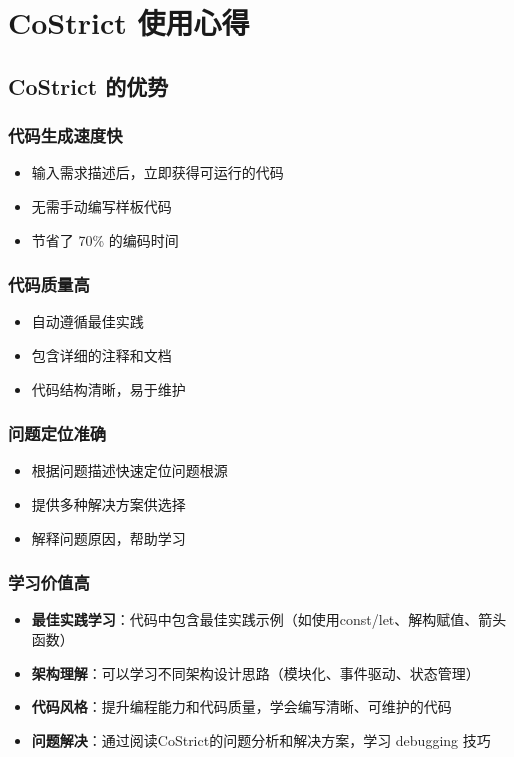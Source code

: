 ﻿\documentclass[12pt,a4paper]{article}
\begin{document}
\section{CoStrict 使用心得}

\subsection{CoStrict 的优势}

\subsubsection{代码生成速度快}
\begin{itemize}
    \item 输入需求描述后，立即获得可运行的代码
    \item 无需手动编写样板代码
    \item 节省了 70\% 的编码时间
\end{itemize}

\subsubsection{代码质量高}
\begin{itemize}
    \item 自动遵循最佳实践
    \item 包含详细的注释和文档
    \item 代码结构清晰，易于维护
\end{itemize}

\subsubsection{问题定位准确}
\begin{itemize}
    \item 根据问题描述快速定位问题根源
    \item 提供多种解决方案供选择
    \item 解释问题原因，帮助学习
\end{itemize}

\subsubsection{学习价值高}
\begin{itemize}
    \item \textbf{最佳实践学习}：代码中包含最佳实践示例（如使用const/let、解构赋值、箭头函数）
    \item \textbf{架构理解}：可以学习不同架构设计思路（模块化、事件驱动、状态管理）
    \item \textbf{代码风格}：提升编程能力和代码质量，学会编写清晰、可维护的代码
    \item \textbf{问题解决}：通过阅读CoStrict的问题分析和解决方案，学习 debugging 技巧
\end{itemize}
\end{document}
